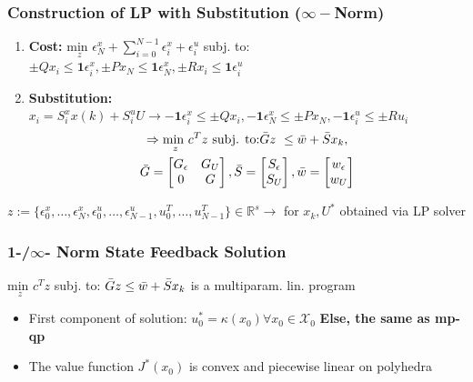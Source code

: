 \subsubsection{Construction of LP with Substitution ($\infty-$Norm)}
\begin{enumerate}
    \item \textbf{Cost: } $\underset{z}{\textrm{min }}\epsilon_N^x+ \sum ^{N-1}_{i=0} \epsilon_i^x +\epsilon_i^u$ subj. to: $\pm Qx_i \leq \mathbf{1} \epsilon_i^x, \pm P x_N \leq \mathbf{1} \epsilon^x_N, \pm Rx_i \leq \mathbf{1}\epsilon_i^u$
    \item \textbf{Substitution:} $x_i = S_i^xx(k) + S_i^u U \rightarrow -\mathbf{1} \epsilon_i^x \leq \pm Qx_i, -\mathbf{1}\epsilon_N^x \leq \pm Px_N, -\mathbf{1}\epsilon_i^u\leq \pm Ru_i$\begin{gather*}\Rightarrow \underset{z}{\textrm{min }}c^Tz \textrm{ subj. to:} \Bar{G}z \ \leq \Bar{w}+\Bar{S}x_k, \\\Bar{G}= \begin{bmatrix}
    G_\epsilon & G_U\\
    0 & G
    \end{bmatrix}, \Bar{S}=\begin{bmatrix}
    S_\epsilon \\ S_U
    \end{bmatrix}, \Bar{w}= \begin{bmatrix}
    w_\epsilon \\ w_U
    \end{bmatrix}
    \end{gather*}
\end{enumerate}
$z := \{\epsilon_0^x,\dotsc,\epsilon_N^x,\epsilon_0^u,\dotsc,\epsilon^u_{N-1}, u_0^T, \dotsc,u_{N-1}^T\} \in \mathbb{R}^s \rightarrow $ for $x_k, U^*$ obtained via LP solver 
\subsubsection{1-/$\infty$- Norm State Feedback Solution}
$\underset{z}{\textrm{min }} c^Tz$ subj. to: $\Bar{G}z \leq \Bar{w}+\Bar{S}x_k$ is a multiparam. lin. program
\begin{itemize}
    \item First component of solution: $u_0^* = \kappa(x_0) \forall x_0 \in \mathcal{X}_0 $ \textbf{Else, the same as mp-qp}
    \item The value function $J^*(x_0)$ is convex and piecewise linear on polyhedra
\end{itemize}
    
